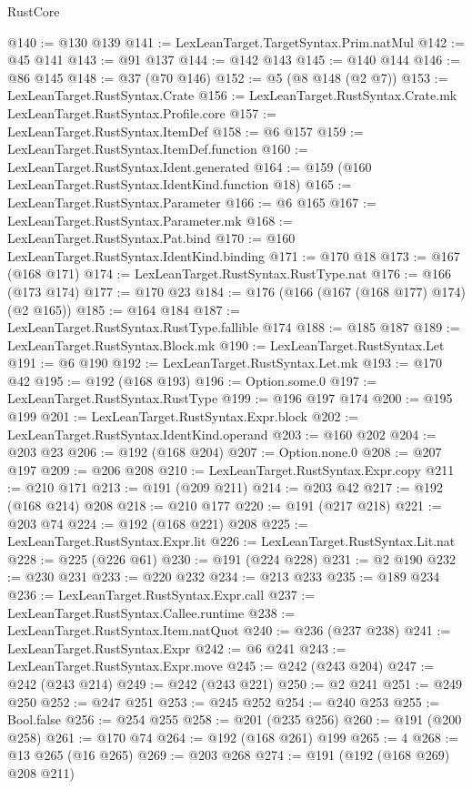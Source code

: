 \begin{lexlean}{RustCore}
\begin{coremodule}
@140 := @130 @139
@141 := LexLeanTarget.TargetSyntax.Prim.natMul
@142 := @45 @141
@143 := @91 @137
@144 := @142 @143
@145 := @140 @144
@146 := @86 @145
@148 := @37 (@70 @146)
@152 := @5 (@8 @148 (@2 @7))
@153 := LexLeanTarget.RustSyntax.Crate
@156 := LexLeanTarget.RustSyntax.Crate.mk LexLeanTarget.RustSyntax.Profile.core
@157 := LexLeanTarget.RustSyntax.ItemDef
@158 := @6 @157
@159 := LexLeanTarget.RustSyntax.ItemDef.function
@160 := LexLeanTarget.RustSyntax.Ident.generated
@164 := @159 (@160 LexLeanTarget.RustSyntax.IdentKind.function @18)
@165 := LexLeanTarget.RustSyntax.Parameter
@166 := @6 @165
@167 := LexLeanTarget.RustSyntax.Parameter.mk
@168 := LexLeanTarget.RustSyntax.Pat.bind
@170 := @160 LexLeanTarget.RustSyntax.IdentKind.binding
@171 := @170 @18
@173 := @167 (@168 @171)
@174 := LexLeanTarget.RustSyntax.RustType.nat
@176 := @166 (@173 @174)
@177 := @170 @23
@184 := @176 (@166 (@167 (@168 @177) @174) (@2 @165))
@185 := @164 @184
@187 := LexLeanTarget.RustSyntax.RustType.fallible @174
@188 := @185 @187
@189 := LexLeanTarget.RustSyntax.Block.mk
@190 := LexLeanTarget.RustSyntax.Let
@191 := @6 @190
@192 := LexLeanTarget.RustSyntax.Let.mk
@193 := @170 @42
@195 := @192 (@168 @193)
@196 := Option.some.{0}
@197 := LexLeanTarget.RustSyntax.RustType
@199 := @196 @197 @174
@200 := @195 @199
@201 := LexLeanTarget.RustSyntax.Expr.block
@202 := LexLeanTarget.RustSyntax.IdentKind.operand
@203 := @160 @202
@204 := @203 @23
@206 := @192 (@168 @204)
@207 := Option.none.{0}
@208 := @207 @197
@209 := @206 @208
@210 := LexLeanTarget.RustSyntax.Expr.copy
@211 := @210 @171
@213 := @191 (@209 @211)
@214 := @203 @42
@217 := @192 (@168 @214) @208
@218 := @210 @177
@220 := @191 (@217 @218)
@221 := @203 @74
@224 := @192 (@168 @221) @208
@225 := LexLeanTarget.RustSyntax.Expr.lit
@226 := LexLeanTarget.RustSyntax.Lit.nat
@228 := @225 (@226 @61)
@230 := @191 (@224 @228)
@231 := @2 @190
@232 := @230 @231
@233 := @220 @232
@234 := @213 @233
@235 := @189 @234
@236 := LexLeanTarget.RustSyntax.Expr.call
@237 := LexLeanTarget.RustSyntax.Callee.runtime
@238 := LexLeanTarget.RustSyntax.Item.natQuot
@240 := @236 (@237 @238)
@241 := LexLeanTarget.RustSyntax.Expr
@242 := @6 @241
@243 := LexLeanTarget.RustSyntax.Expr.move
@245 := @242 (@243 @204)
@247 := @242 (@243 @214)
@249 := @242 (@243 @221)
@250 := @2 @241
@251 := @249 @250
@252 := @247 @251
@253 := @245 @252
@254 := @240 @253
@255 := Bool.false
@256 := @254 @255
@258 := @201 (@235 @256)
@260 := @191 (@200 @258)
@261 := @170 @74
@264 := @192 (@168 @261) @199
@265 := 4
@268 := @13 @265 (@16 @265)
@269 := @203 @268
@274 := @191 (@192 (@168 @269) @208 @211)

\end{coremodule}
\end{lexlean}
